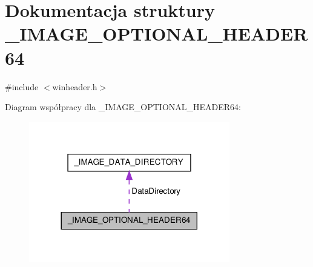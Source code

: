 \hypertarget{struct___i_m_a_g_e___o_p_t_i_o_n_a_l___h_e_a_d_e_r64}{\section{Dokumentacja struktury \-\_\-\-I\-M\-A\-G\-E\-\_\-\-O\-P\-T\-I\-O\-N\-A\-L\-\_\-\-H\-E\-A\-D\-E\-R64}
\label{struct___i_m_a_g_e___o_p_t_i_o_n_a_l___h_e_a_d_e_r64}
}


{\ttfamily \#include $<$winheader.\-h$>$}



Diagram współpracy dla \-\_\-\-I\-M\-A\-G\-E\-\_\-\-O\-P\-T\-I\-O\-N\-A\-L\-\_\-\-H\-E\-A\-D\-E\-R64\-:\nopagebreak
\begin{figure}[H]
\begin{center}
\leavevmode
\includegraphics[width=248pt]{struct___i_m_a_g_e___o_p_t_i_o_n_a_l___h_e_a_d_e_r64__coll__graph}
\end{center}
\end{figure}
